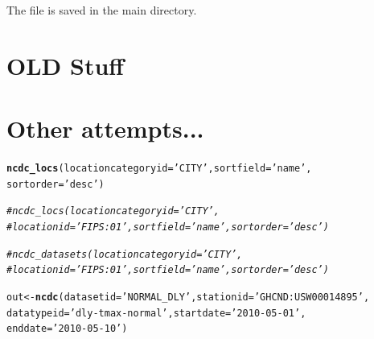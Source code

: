 \documentclass{article}\usepackage[]{graphicx}\usepackage[]{color}
\makeatletter
\newcommand{\hlstr}[1]{\textcolor[rgb]{0.192,0.494,0.8}{#1}}%
\newcommand{\hlcom}[1]{\textcolor[rgb]{0.678,0.584,0.686}{\textit{#1}}}%
\newcommand{\hlstd}[1]{\textcolor[rgb]{0.345,0.345,0.345}{#1}}%
\newcommand{\hlkwb}[1]{\textcolor[rgb]{0.69,0.353,0.396}{#1}}%
\newcommand{\hlkwc}[1]{\textcolor[rgb]{0.333,0.667,0.333}{#1}}%
\newcommand{\hlkwd}[1]{\textcolor[rgb]{0.737,0.353,0.396}{\textbf{#1}}}%
\newenvironment{kframe}{%
 \def\at@end@of@kframe{}%
 \ifinner\ifhmode%
  \def\at@end@of@kframe{\end{minipage}}%
  \begin{minipage}{\columnwidth}%
 \fi\fi%
 \def\FrameCommand##1{\hskip\@totalleftmargin \hskip-\fboxsep
 \colorbox{shadecolor}{##1}\hskip-\fboxsep
     \hskip-\linewidth \hskip-\@totalleftmargin \hskip\columnwidth}%
 \MakeFramed {\advance\hsize-\width
   \@totalleftmargin\z@ \linewidth\hsize
   \@setminipage}}%
 {\par\unskip\endMakeFramed%
 \at@end@of@kframe}
\newenvironment{knitrout}{}{} %
\makeatother
\begin{document}
The file is saved in the main directory. 


\section{OLD Stuff}




\section{ Other attempts...}

\begin{knitrout}
\color{fgcolor}\begin{kframe}
\begin{alltt}
\hlkwd{ncdc_locs}\hlstd{(}\hlkwc{locationcategoryid}\hlstd{=}\hlstr{'CITY'}\hlstd{,} \hlkwc{sortfield}\hlstd{=}\hlstr{'name'}\hlstd{,}
          \hlkwc{sortorder}\hlstd{=}\hlstr{'desc'}\hlstd{)}

\hlcom{# ncdc_locs(locationcategoryid='CITY', }
\hlcom{#  locationid='FIPS:01', sortfield='name', sortorder='desc')}

\hlcom{#ncdc_datasets(locationcategoryid='CITY', }
\hlcom{#   locationid='FIPS:01', sortfield='name', sortorder='desc')}


\hlstd{out} \hlkwb{<-} \hlkwd{ncdc}\hlstd{(}\hlkwc{datasetid}\hlstd{=}\hlstr{'NORMAL_DLY'}\hlstd{,} \hlkwc{stationid}\hlstd{=}\hlstr{'GHCND:USW00014895'}\hlstd{,}
            \hlkwc{datatypeid}\hlstd{=}\hlstr{'dly-tmax-normal'}\hlstd{,} \hlkwc{startdate} \hlstd{=} \hlstr{'2010-05-01'}\hlstd{,}
            \hlkwc{enddate} \hlstd{=} \hlstr{'2010-05-10'}\hlstd{)}
\end{alltt}
\end{kframe}
\end{knitrout}
\end{document}
